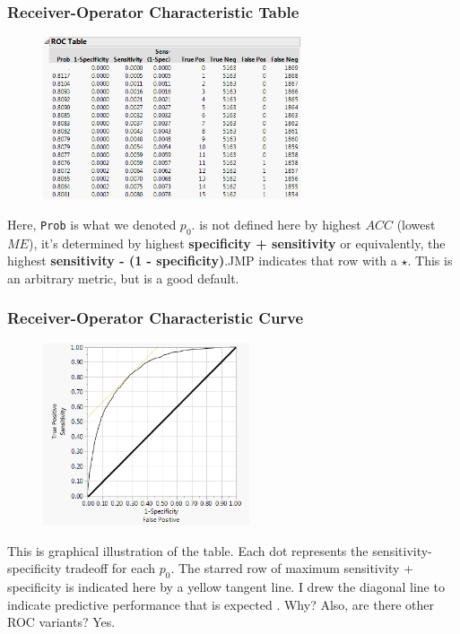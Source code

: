 \documentclass[handout]{beamer}
\begin{document}
\begin{frame}\frametitle{Receiver-Operator Characteristic Table}

\begin{figure}
\centering
\hspace{-0.5cm}\includegraphics[width=3.0in]{roc_table.png}
\end{figure}

\vspace{-0.3cm}
Here, \texttt{Prob} is what we denoted $p_0$.  is not defined here by highest $ACC$ (lowest $ME$), it's determined by highest \textbf{specificity + sensitivity} or equivalently, the highest \textbf{sensitivity - (1 - specificity)}.JMP indicates that row with a $\star$. This is an arbitrary metric, but is a good default.

\end{frame}

\begin{frame}\frametitle{Receiver-Operator Characteristic Curve}

\vspace{-0.2cm}
\begin{figure}
\centering
\hspace{-0.5cm}\includegraphics[width=2.4in]{roc_curve.png}
\end{figure}

\small
\vspace{-0.3cm}
This is graphical illustration of the table. Each dot represents the sensitivity-specificity tradeoff for each $p_0$. \pause The starred row of maximum sensitivity + specificity is indicated here by a yellow tangent line. \pause I drew the diagonal line to indicate predictive performance that is expected . Why? \pause Also, are there other ROC variants? \pause Yes.

\end{frame}
\end{document}
